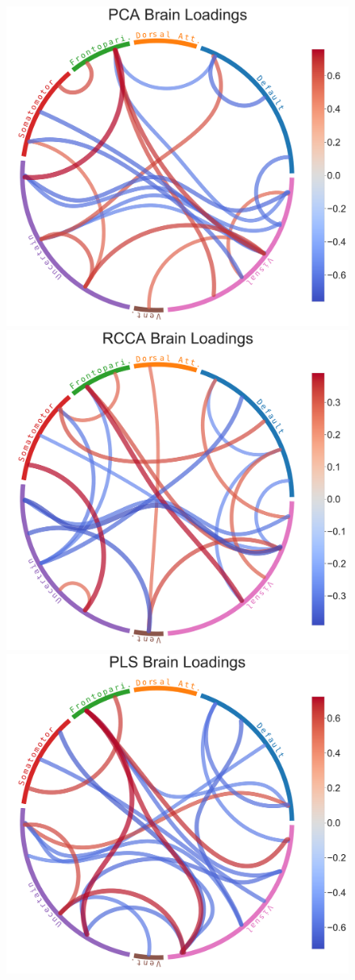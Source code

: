 \begin{figure}
\centering
\includegraphics[width=0.72\linewidth]{figures/regularization/hcp/PCA brain loadings.pdf}
\includegraphics[width=0.72\linewidth]{figures/regularization/hcp/RCCA brain loadings.pdf}
\includegraphics[width=0.72\linewidth]{figures/regularization/hcp/PLS brain loadings.pdf}

\end{figure}
